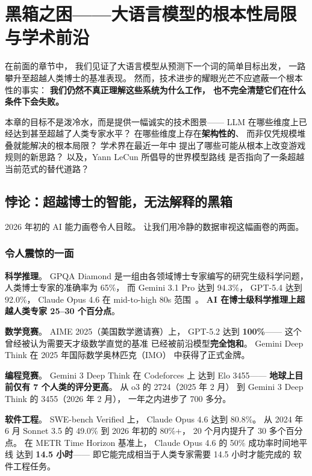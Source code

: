 \chapter{黑箱之困——大语言模型的根本性局限与学术前沿}
\label{ch:limitations}

在前面的章节中，
我们见证了大语言模型从预测下一个词的简单目标出发，
一路攀升至超越人类博士的基准表现。
然而，技术进步的耀眼光芒不应遮蔽一个根本性的事实：
\textbf{我们仍然不真正理解这些系统为什么工作，
也不完全清楚它们在什么条件下会失败。}

本章的目标不是泼冷水，而是提供一幅诚实的技术图景——
LLM 在哪些维度上已经达到甚至超越了人类专家水平？
在哪些维度上存在\textbf{架构性的}、
而非仅凭规模堆叠就能解决的根本局限？
学术界在最近一年中
提出了哪些可能从根本上改变游戏规则的新思路？
以及，Yann LeCun 所倡导的世界模型路线
是否指向了一条超越当前范式的替代道路？

\section{悖论：超越博士的智能，无法解释的黑箱}
\label{sec:paradox}

2026 年初的 AI 能力画卷令人目眩。
让我们用冷静的数据审视这幅画卷的两面。

\subsection{令人震惊的一面}

\textbf{科学推理}。
GPQA Diamond 是一组由各领域博士专家编写的研究生级科学问题，
人类博士专家的准确率为 65\%，
而 Gemini 3.1 Pro 达到 94.3\%，
GPT-5.4 达到 92.0\%，
Claude Opus 4.6 在 mid-to-high 80s 范围~\cite{rein2024gpqa}。
\textbf{AI 在博士级科学推理上超越人类专家 25--30 个百分点}。

\textbf{数学竞赛}。
AIME 2025（美国数学邀请赛）上，
GPT-5.2 达到 \textbf{100\%}——
这个曾经被认为需要天才级数学直觉的基准
已经被前沿模型\textbf{完全饱和}。
Gemini Deep Think 在 2025 年国际数学奥林匹克（IMO）
中获得了正式金牌。

\textbf{编程竞赛}。
Gemini 3 Deep Think 在 Codeforces 上
达到 Elo 3455——
\textbf{地球上目前仅有 7 个人类的评分更高}。
从 o3 的 2724（2025 年 2 月）
到 Gemini 3 Deep Think 的 3455（2026 年 2 月），
一年之内进步了 700 多分。

\textbf{软件工程}。
SWE-bench Verified 上，
Claude Opus 4.6 达到 80.8\%。
从 2024 年 6 月 Sonnet 3.5 的 49.0\%
到 2026 年初的 80\%+，
20 个月内提升了 30 多个百分点。
在 METR Time Horizon 基准上，
Claude Opus 4.6 的 50\% 成功率时间地平线
达到 \textbf{14.5 小时}——
即它能完成相当于人类专家需要 14.5 小时才能完成的
软件工程任务。


